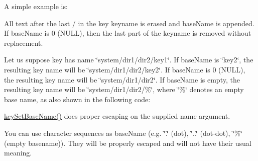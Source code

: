 A simple example is\+: 
 All text after the last {\ttfamily \textquotesingle{}/\textquotesingle{}} in the {\ttfamily key} keyname is erased and {\ttfamily base\+Name} is appended. If {\ttfamily base\+Name} is 0 (N\+U\+LL), then the last part of the keyname is removed without replacement.

Let us suppose {\ttfamily key} has name {\ttfamily \char`\"{}system/dir1/dir2/key1\char`\"{}}. If {\ttfamily base\+Name} is {\ttfamily \char`\"{}key2\char`\"{}}, the resulting key name will be {\ttfamily \char`\"{}system/dir1/dir2/key2\char`\"{}}. If {\ttfamily base\+Name} is 0 (N\+U\+LL), the resulting key name will be {\ttfamily \char`\"{}system/dir1/dir2\char`\"{}}. If {\ttfamily base\+Name} is empty, the resulting key name will be {\ttfamily \char`\"{}system/dir1/dir2/\%\char`\"{}}, where {\ttfamily \char`\"{}\%\char`\"{}} denotes an empty base name, as also shown in the following code\+:


 \hyperlink{group__keyname_ga6e804bd453f98c28b0ff51430d1df407}{key\+Set\+Base\+Name()} does proper escaping on the supplied name argument.

You can use character sequences as {\ttfamily base\+Name} (e.\+g. {\ttfamily \char`\"{}.\char`\"{}} (dot), {\ttfamily \char`\"{}..\char`\"{}} (dot-\/dot), {\ttfamily \char`\"{}\%\char`\"{}} (empty basename)). They will be properly escaped and will not have their usual meaning.

